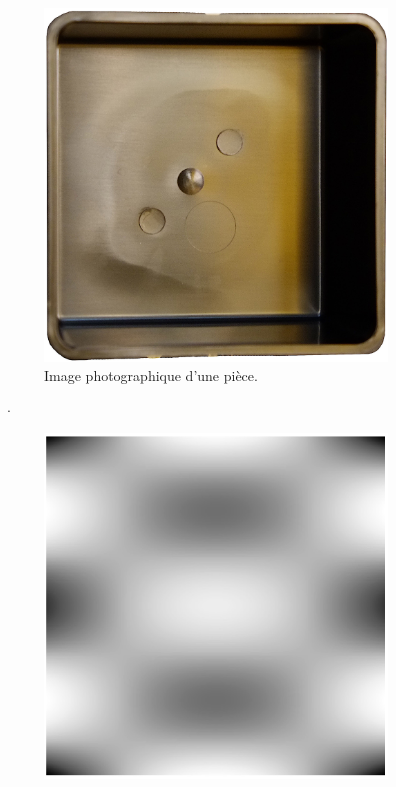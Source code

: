 \begin{figure}[htb]
	\centering
	\begin{subfigure}[l]{0.37\textwidth}
		\centering
		\includegraphics[width=\textwidth]{../Chap2/Figures/163-35_r.jpeg}
		\caption{Image photographique d'une pièce.}
	\end{subfigure}
	$\ \boldsymbol{\cdot} \ $
	\begin{subfigure}[c]{0.37\textwidth}
		\centering
		\includegraphics[width=\textwidth]{../Chap2/Figures/DMD_mode24_10x10.jpg}

\end{subfigure}
\end{figure}
